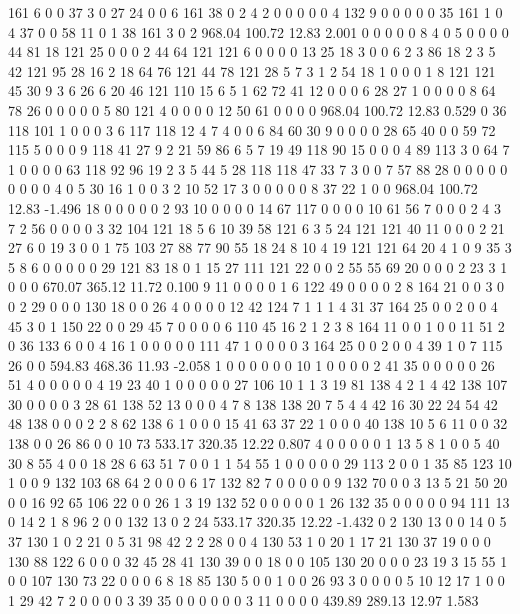  161 6 0 0 37 3 0 27 24 0 0 6 161 38 0 2 4 2 0 0
 0 0 0 4 132 9 0 0 0 0 0 35 161 1 0 4 37 0 0 58
 11 0 1 38 161 3 0 2
968.04 100.72 12.83 2.001
 0 0 0 0 0 8 4 0 5 0 0 0 0 44 81 18 121 25 0 0
 0 2 44 64 121 121 6 0 0 0 0 13 25 18 3 0 0 6 2 3
 86 18 2 3 5 42 121 95 28 16 2 18 64 76 121 44 78 121 28 5
 7 3 1 2 54 18 1 0 0 0 1 8 121 121 45 30 9 3 6 26
 6 20 46 121 110 15 6 5 1 62 72 41 12 0 0 0 6 28 27 1
 0 0 0 0 8 64 78 26 0 0 0 0 0 5 80 121 4 0 0 0
 0 12 50 61 0 0 0 0
968.04 100.72 12.83 0.529
 0 36 118 101 1 0 0 0 3 6 117 118 12 4 7 4 0 0 6 84
 60 30 9 0 0 0 0 28 65 40 0 0 59 72 115 5 0 0 0 9
 118 41 27 9 2 21 59 86 6 5 7 19 49 118 90 15 0 0 0 4
 89 113 3 0 64 7 1 0 0 0 0 63 118 92 96 19 2 3 5 44
 5 28 118 118 47 33 7 3 0 0 7 57 88 28 0 0 0 0 0 0
 0 0 0 4 0 5 30 16 1 0 0 3 2 10 52 17 3 0 0 0
 0 0 8 37 22 1 0 0
968.04 100.72 12.83 -1.496
 18 0 0 0 0 0 2 93 10 0 0 0 0 14 67 117 0 0 0 0
 10 61 56 7 0 0 0 2 4 3 7 2 56 0 0 0 0 3 32 104
 121 18 5 6 10 39 58 121 6 3 5 24 121 121 40 11 0 0 0 2
 21 27 6 0 19 3 0 0 1 75 103 27 88 77 90 55 18 24 8 10
 4 19 121 121 64 20 4 1 0 9 35 3 5 8 6 0 0 0 0 0
 29 121 83 18 0 1 15 27 111 121 22 0 0 2 55 55 69 20 0 0
 0 2 23 3 1 0 0 0
670.07 365.12 11.72 0.100
 9 11 0 0 0 0 1 6 122 49 0 0 0 0 2 8 164 21 0 0
 3 0 0 2 29 0 0 0 130 18 0 0 26 4 0 0 0 0 12 42
 124 7 1 1 1 4 31 37 164 25 0 0 2 0 0 4 45 3 0 1
 150 22 0 0 29 45 7 0 0 0 0 6 110 45 16 2 1 2 3 8
 164 11 0 0 1 0 0 11 51 2 0 36 133 6 0 0 4 16 1 0
 0 0 0 0 111 47 1 0 0 0 0 3 164 25 0 0 2 0 0 4
 39 1 0 7 115 26 0 0
594.83 468.36 11.93 -2.058
 1 0 0 0 0 0 0 10 1 0 0 0 0 2 41 35 0 0 0 0
 0 26 51 4 0 0 0 0 0 4 19 23 40 1 0 0 0 0 0 27
 106 10 1 1 3 19 81 138 4 2 1 4 42 138 107 30 0 0 0 0
 3 28 61 138 52 13 0 0 0 4 7 8 138 138 20 7 5 4 4 42
 16 30 22 24 54 42 48 138 0 0 0 2 2 8 62 138 6 1 0 0
 0 15 41 63 37 22 1 0 0 0 40 138 10 5 6 11 0 0 32 138
 0 0 26 86 0 0 10 73
533.17 320.35 12.22 0.807
 4 0 0 0 0 0 1 13 5 8 1 0 0 5 40 30 8 55 4 0
 0 18 28 6 63 51 7 0 0 1 1 54 55 1 0 0 0 0 0 29
 113 2 0 0 1 35 85 123 10 1 0 0 9 132 103 68 64 2 0 0
 0 6 17 132 82 7 0 0 0 0 0 9 132 70 0 0 3 13 5 21
 50 20 0 0 16 92 65 106 22 0 0 26 1 3 19 132 52 0 0 0
 0 0 1 26 132 35 0 0 0 0 0 94 111 13 0 14 2 1 8 96
 2 0 0 132 13 0 2 24
533.17 320.35 12.22 -1.432
 0 2 130 13 0 0 14 0 5 37 130 1 0 2 21 0 5 31 98 42
 2 2 28 0 0 4 130 53 1 0 20 1 17 21 130 37 19 0 0 0
 130 88 122 6 0 0 0 32 45 28 41 130 39 0 0 18 0 0 105 130
 20 0 0 0 23 19 3 15 55 1 0 0 107 130 73 22 0 0 0 6
 8 18 85 130 5 0 0 1 0 0 26 93 3 0 0 0 0 5 10 12
 17 1 0 0 1 29 42 7 2 0 0 0 0 3 39 35 0 0 0 0
 0 0 3 11 0 0 0 0
439.89 289.13 12.97 1.583
